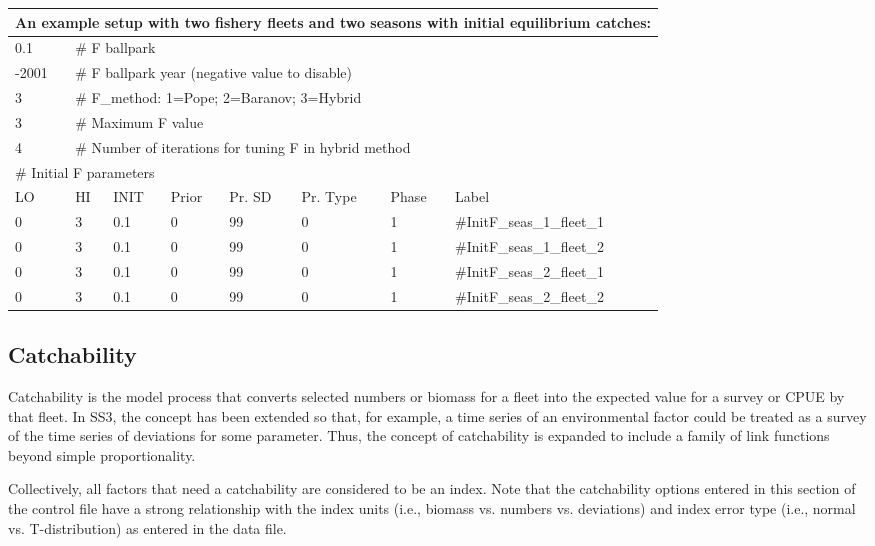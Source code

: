 \begin{longtable}{p{1.3cm} p{1.3cm} p{1.3cm} p{1.3cm} p{1.5cm} p{1.5cm} p{1.4cm} p{2.3cm}}
	\multicolumn{8}{l}{An example setup with two fishery fleets and two seasons with initial equilibrium catches:} \\
	\hline
	0.1 & \multicolumn{7}{l}{\# F ballpark} \Tstrut\Bstrut\\
	\hline
	-2001 & \multicolumn{7}{l}{\# F ballpark year (negative value to disable)} \Tstrut\Bstrut\\
	\hline
	3 & \multicolumn{7}{l}{\# F\_method: 1=Pope; 2=Baranov; 3=Hybrid} \Tstrut\Bstrut\\
	\hline
	3 & \multicolumn{7}{l}{\# Maximum F value} \Tstrut\Bstrut\\
	\hline
	4 & \multicolumn{7}{l}{\# Number of iterations for tuning F in hybrid method} \Tstrut\Bstrut\\
	\hline
	\multicolumn{8}{l}{\# Initial F parameters} \Tstrut\Bstrut\\
	LO & HI & INIT & Prior & Pr. SD & Pr. Type & Phase & Label \Bstrut\\
	\hline
	0 & 3 & 0.1 & 0 & 99 & 0 & 1 & \#InitF\_seas\_1\_fleet\_1 \Tstrut\Bstrut\\
	\hline
	0 & 3 & 0.1 & 0 & 99 & 0 & 1 & \#InitF\_seas\_1\_fleet\_2 \Tstrut\Bstrut\\
	\hline
	0 & 3 & 0.1 & 0 & 99 & 0 & 1 & \#InitF\_seas\_2\_fleet\_1 \Tstrut\Bstrut\\
	\hline
	0 & 3 & 0.1 & 0 & 99 & 0 & 1 & \#InitF\_seas\_2\_fleet\_2 \Tstrut\Bstrut\\
	\hline
\end{longtable}


\hypertarget{Qsetup}{}
\subsection{Catchability}
Catchability is the model process that converts selected numbers or biomass for a fleet into the expected value for a survey or CPUE by that fleet. In SS3, the concept has been extended so that, for example, a time series of an environmental factor could be treated as a survey of the time series of deviations for some parameter. Thus, the concept of catchability is expanded to include a family of link functions beyond simple proportionality.

Collectively, all factors that need a catchability are considered to be an index. Note that the catchability options entered in this section of the control file have a strong relationship with the index units (i.e., biomass vs. numbers vs. deviations) and index error type (i.e., normal vs. T-distribution) as entered in the data file.

